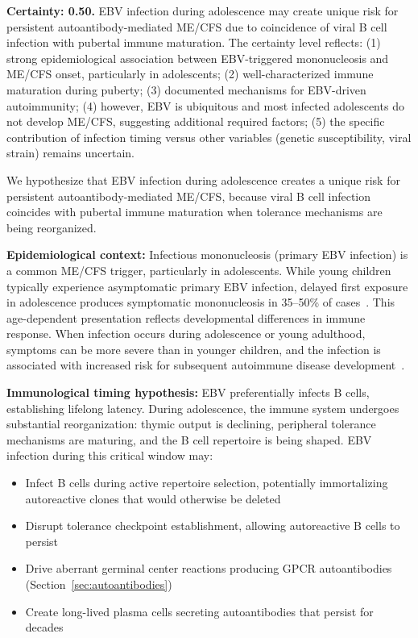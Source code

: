 \begin{hypothesis}
\label{hyp:ebv-adolescence}

\textbf{Certainty: 0.50.} EBV infection during adolescence may create unique risk for persistent autoantibody-mediated ME/CFS due to coincidence of viral B cell infection with pubertal immune maturation. The certainty level reflects: (1) strong epidemiological association between EBV-triggered mononucleosis and ME/CFS onset, particularly in adolescents; (2) well-characterized immune maturation during puberty; (3) documented mechanisms for EBV-driven autoimmunity; (4) however, EBV is ubiquitous and most infected adolescents do not develop ME/CFS, suggesting additional required factors; (5) the specific contribution of infection timing versus other variables (genetic susceptibility, viral strain) remains uncertain.

We hypothesize that EBV infection during adolescence creates a unique risk for persistent autoantibody-mediated ME/CFS, because viral B cell infection coincides with pubertal immune maturation when tolerance mechanisms are being reorganized.

\textbf{Epidemiological context:}
Infectious mononucleosis (primary EBV infection) is a common ME/CFS trigger, particularly in adolescents. While young children typically experience asymptomatic primary EBV infection, delayed first exposure in adolescence produces symptomatic mononucleosis in 35--50\% of cases~\cite{ScanJImmunol2025EBV}. This age-dependent presentation reflects developmental differences in immune response. When infection occurs during adolescence or young adulthood, symptoms can be more severe than in younger children, and the infection is associated with increased risk for subsequent autoimmune disease development~\cite{FrontImmunol2024EBV}.

\textbf{Immunological timing hypothesis:}
EBV preferentially infects B cells, establishing lifelong latency. During adolescence, the immune system undergoes substantial reorganization: thymic output is declining, peripheral tolerance mechanisms are maturing, and the B cell repertoire is being shaped. EBV infection during this critical window may:
\begin{itemize}
    \item Infect B cells during active repertoire selection, potentially immortalizing autoreactive clones that would otherwise be deleted
    \item Disrupt tolerance checkpoint establishment, allowing autoreactive B cells to persist
    \item Drive aberrant germinal center reactions producing GPCR autoantibodies (Section~\ref{sec:autoantibodies})
    \item Create long-lived plasma cells secreting autoantibodies that persist for decades
\end{itemize}


\end{hypothesis}
